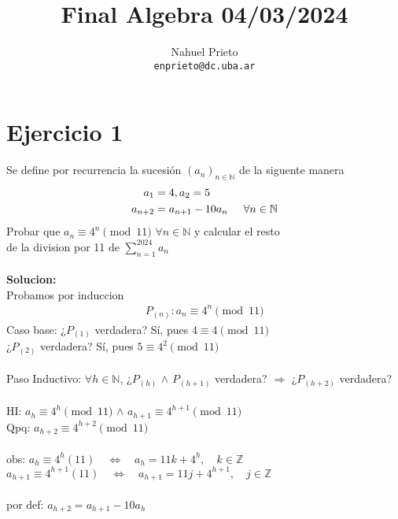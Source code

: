 \documentclass[a4paper]{article}
\title{Final Algebra 04/03/2024}
\author{Nahuel Prieto \\ \texttt{enprieto@dc.uba.ar}}
\date{}
\begin{document}
\maketitle

\section{Ejercicio 1}
    Se define por recurrencia la sucesión $(a_{n})_{n \in \mathbb{N}}$ de la siguente manera 
\begin{align*}
    a_1 &= 4,  a_2 = 5 \\ a_{n+2} &= a_{n+1} - 10a_n \hspace{0.5cm} \forall n \in \mathbb{N}
\end{align*}
Probar que $a_n\equiv 4^n \pmod{11}$ $\forall n \in \mathbb{N}$ y calcular el resto \\
de la division por 11 de $\sum_{n=1}^{2024} a_n$\\ \\
\textbf{Solucion:} \\
Probamos por induccion
\begin{align*}
    P_{(n)}: a_n \equiv 4^n \pmod{11}
\end{align*}
Caso base: ¿$P_{(1)}$ verdadera? Sí, pues $4 \equiv 4 \pmod{11}$\\
\hspace*{50px}¿$P_{(2)}$ verdadera? Sí, pues $5 \equiv 4^2 \pmod{11}$ \\ \\
Paso Inductivo: $\forall h \in \mathbb{N}$, ¿$P_{(h)}$ $\land$ $P_{(h+1)}$ verdadera? $\Rightarrow$ ¿$P_{(h+2)}$ verdadera? \\ \\
HI: $a_h \equiv 4^h \pmod{11}$ $\land$ $a_{h+1} \equiv 4^{h+1} \pmod{11}$ \\
Qpq: $a_{h+2} \equiv 4^{h+2} \pmod{11}$ \\ \\
obs: $a_h \equiv 4^h (11) \quad \Longleftrightarrow \quad a_h = 11k +4^h, \quad k \in \mathbb{Z}$  \\
\hspace*{0.4cm}$a_{h+1} \equiv 4^{h+1} (11) \quad \Longleftrightarrow \quad a_{h+1} = 11j +4^{h+1}, \quad j \in \mathbb{Z}$ \\ \\
por def: $a_{h+2} = a_{h+1} - 10a_h$     
\end{document}
